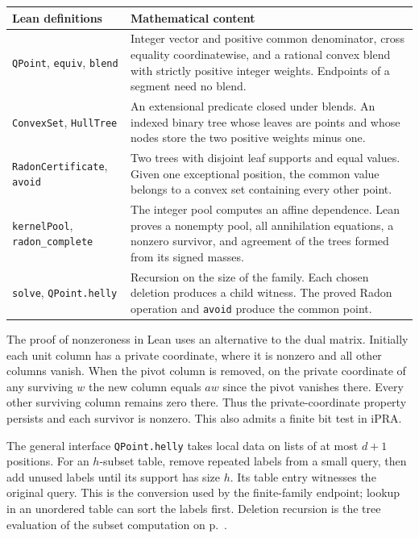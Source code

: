 \documentclass[11pt,letterpaper]{article}
\theoremstyle{packet}\newtheorem{theorem}{Theorem}\newtheorem{lem}[theorem]{Lemma}
\begin{document}
\begin{center}\begin{tabularx}{\linewidth}{@{}p{.31\linewidth}X@{}}\toprule
\textbf{Lean definitions} & \textbf{Mathematical content}\\\midrule
\texttt{QPoint}, \texttt{equiv}, \texttt{blend} & Integer vector and positive common denominator, cross equality coordinatewise, and a rational convex blend with strictly positive integer weights. Endpoints of a segment need no blend.\\[3pt]
\texttt{ConvexSet}, \texttt{HullTree} & An extensional predicate closed under blends. An indexed binary tree whose leaves are points and whose nodes store the two positive weights minus one.\\[3pt]
\texttt{RadonCertificate}, \texttt{avoid} & Two trees with disjoint leaf supports and equal values. Given one exceptional position, the common value belongs to a convex set containing every other point.\\[3pt]
\texttt{kernelPool}, \texttt{radon\_complete} & The integer pool computes an affine dependence. Lean proves a nonempty pool, all annihilation equations, a nonzero survivor, and agreement of the trees formed from its signed masses.\\[3pt]
\texttt{solve}, \texttt{QPoint.helly} & Recursion on the size of the family. Each chosen deletion produces a child witness. The proved Radon operation and \texttt{avoid} produce the common point.\\\bottomrule
\end{tabularx}\end{center}

The proof of nonzeroness in Lean uses an alternative to the dual matrix. Initially each unit column has a private coordinate, where it is nonzero and all other columns vanish. When the pivot column is removed, on the private coordinate of any surviving $w$ the new column equals $a w$ since the pivot vanishes there. Every other surviving column remains zero there. Thus the private-coordinate property persists and each survivor is nonzero. This also admits a finite bit test in iPRA.

The general interface \texttt{QPoint.helly} takes local data on lists of at most $d+1$ positions. For an $h$-subset table, remove repeated labels from a small query, then add unused labels until its support has size $h$. Its table entry witnesses the original query. This is the conversion used by the finite-family endpoint; lookup in an unordered table can sort the labels first. Deletion recursion is the tree evaluation of the subset computation on p.~\pageref{sec:glue}.
\end{document}
